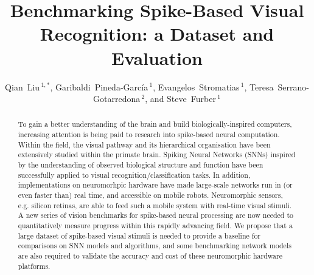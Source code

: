 \documentclass{frontiersENG} %
\def\firstAuthorLast{Qian Liu {et~al.}} %
\def\Authors{Qian~Liu\,$^{1,*}$, Garibaldi~Pineda-Garc\'ia\,$^{1}$, Evangelos~Stromatias\,$^{1}$, Teresa~Serrano-Gotarredona\,$^{2}$, and Steve~Furber\,$^{1}$}
\begin{document}
\onecolumn
{}

\title[Benchmarking Spike-Based Visual Recognition: a Dataset and Evaluation]{Benchmarking  Spike-Based Visual Recognition: a Dataset and Evaluation}
\author[\firstAuthorLast ]{\Authors}
\address{}
\correspondance{}
\extraAuth{}%
\topic{}

\maketitle
\begin{abstract}

To gain a better understanding of the brain and build biologically-inspired computers, increasing attention is being paid to research into spike-based neural computation.
Within the field, the visual pathway and its hierarchical organisation have been extensively studied within the primate brain.
Spiking Neural Networks (SNNs) inspired by the understanding of observed biological structure and function have been successfully applied to visual recognition/classification tasks.
In addition, implementations on neuromorhpic hardware have made large-scale networks run in (or even faster than) real time, and accessible on mobile robots.
Neuromorphic sensors, e.g. silicon retinas, are able to feed such a mobile system with real-time visual stimuli.
A new series of vision benchmarks for spike-based neural processing are now needed to quantitatively measure progress within this rapidly advancing field.
We propose that a large dataset of spike-based visual stimuli is needed to provide a baseline for comparisons on SNN models and algorithms, and some benchmarking network models are also required to validate the accuracy and cost of these neuromorphic hardware platforms.


\end{abstract}
\end{document}
